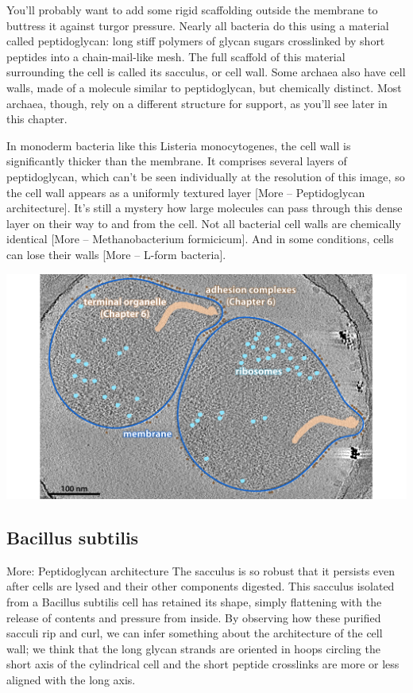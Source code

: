 \documentclass[]{tufte-book}
\begin{document}
You'll probably want to add some rigid scaffolding outside the membrane
to buttress it against turgor pressure. Nearly all bacteria do this
using a material called peptidoglycan: long stiff polymers of glycan
sugars crosslinked by short peptides into a chain-mail-like mesh. The
full scaffold of this material surrounding the cell is called its
sacculus, or cell wall. Some archaea also have cell walls, made of a
molecule similar to peptidoglycan, but chemically distinct. Most
archaea, though, rely on a different structure for support, as you'll
see later in this chapter.

In monoderm bacteria like this Listeria monocytogenes, the cell wall is
significantly thicker than the membrane. It comprises several layers of
peptidoglycan, which can't be seen individually at the resolution of
this image, so the cell wall appears as a uniformly textured layer
{[}More -- Peptidoglycan architecture{]}. It's still a mystery how large
molecules can pass through this dense layer on their way to and from the
cell. Not all bacterial cell walls are chemically identical {[}More --
Methanobacterium formicicum{]}. And in some conditions, cells can lose
their walls {[}More -- L-form bacteria{]}.

\includegraphics{img/02_static/2_1_Mgenitalium}

\subsection{Bacillus subtilis}\label{bacillus-subtilis}

More: Peptidoglycan architecture The sacculus is so robust that it
persists even after cells are lysed and their other components digested.
This sacculus isolated from a Bacillus subtilis cell has retained its
shape, simply flattening with the release of contents and pressure from
inside. By observing how these purified sacculi rip and curl, we can
infer something about the architecture of the cell wall; we think that
the long glycan strands are oriented in hoops circling the short axis of
the cylindrical cell and the short peptide crosslinks are more or less
aligned with the long axis.
\end{document}

